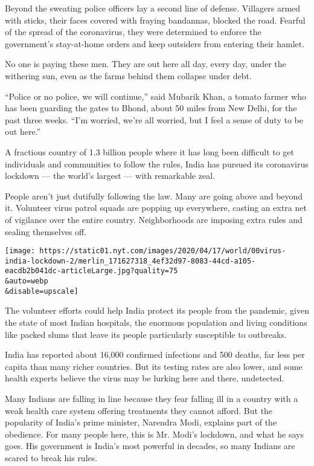 Beyond the sweating police officers lay a second line of defense.
Villagers armed with sticks, their faces covered with fraying bandannas,
blocked the road. Fearful of the spread of the coronavirus, they were
determined to enforce the government's stay-at-home orders and keep
outsiders from entering their hamlet.

No one is paying these men. They are out here all day, every day, under
the withering sun, even as the farms behind them collapse under debt.

``Police or no police, we will continue,'' said Mubarik Khan, a tomato
farmer who has been guarding the gates to Bhond, about 50 miles from New
Delhi, for the past three weeks. ``I'm worried, we're all worried, but I
feel a sense of duty to be out here.''

A fractious country of 1.3 billion people where it has long been
difficult to get individuals and communities to follow the rules, India
has pursued its coronavirus lockdown --- the world's largest --- with
remarkable zeal.

People aren't just dutifully following the law. Many are going above and
beyond it. Volunteer virus patrol squads are popping up everywhere,
casting an extra net of vigilance over the entire country. Neighborhoods
are imposing extra rules and sealing themselves off.

\texttt{[image: https://static01.nyt.com/images/2020/04/17/world/00virus-india-lockdown-2/merlin\_171627318\_4ef32d97-8083-44cd-a105-eacdb2b041dc-articleLarge.jpg?quality=75\\\&auto=webp\\\&disable=upscale]}

The volunteer efforts could help India protect its people from the
pandemic, given the state of most Indian hospitals, the enormous
population and living conditions like packed slums that leave its people
particularly susceptible to outbreaks.

India has reported about 16,000 confirmed infections and 500 deaths, far
less per capita than many richer countries. But its testing rates are
also lower, and some health experts believe the virus may be lurking
here and there, undetected.

Many Indians are falling in line because they fear falling ill in a
country with a weak health care system offering treatments they cannot
afford. But the popularity of India's prime minister, Narendra Modi,
explains part of the obedience. For many people here, this is Mr. Modi's
lockdown, and what he says goes. His government is India's most powerful
in decades, so many Indians are scared to break his rules.

